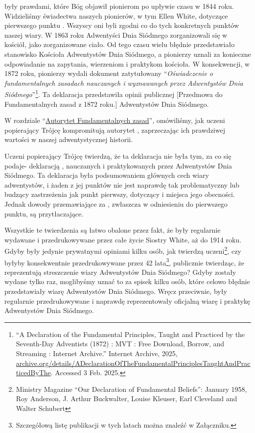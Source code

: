  były prawdami, które Bóg objawił pionierom po upływie czasu w 1844 roku. Widzieliśmy świadectwa naszych pionierów, w tym Ellen White, dotyczące pierwszego punktu . Wszyscy oni byli zgodni co do tych konkretnych punktów naszej wiary. W 1863 roku Adwentyści Dnia Siódmego zorganizowali się w kościół, jako zorganizowane ciało. Od tego czasu wielu błędnie przedstawiało stanowisko Kościoła Adwentystów Dnia Siódmego, a pionierzy uznali za konieczne odpowiadanie na zapytania,  wierzeniom i praktykom kościoła. W konsekwencji, w 1872 roku, pionierzy wydali dokument zatytułowany “\textit{Oświadczenie o fundamentalnych zasadach nauczanych i wyznawanych przez Adwentystów Dnia Siódmego}”\footnote{“A Declaration of the Fundamental Principles, Taught and Practiced by the Seventh-Day Adventists (1872) : MVT : Free Download, Borrow, and Streaming : Internet Archive.” Internet Archive, 2025, \href{https://archive.org/details/ADeclarationOfTheFundamentalPrinciplesTaughtAndPracticedByThe}{archive.org/details/ADeclarationOfTheFundamentalPrinciplesTaughtAndPracticedByThe}. Accessed 3 Feb. 2025.}. Ta deklaracja przedstawiła opinii publicznej [Przedmowa do Fundamentalnych zasad z 1872 roku.] Adwentystów Dnia Siódmego.

W rozdziale “\hyperref[chap:authority]{Autorytet Fundamentalnych zasad}”, omówiliśmy, jak uczeni popierający Trójcę kompromitują autorytet , zaprzeczając ich prawdziwej wartości w naszej adwentystycznej historii.

Uczeni popierający Trójcę twierdzą, że ta deklaracja nie była tym, za co się podaje- deklaracją , nauczanych i praktykowanych przez Adwentystów Dnia Siódmego. Ta deklaracja była podsumowaniem głównych cech wiary adwentystów, i żaden z jej punktów nie jest naprawdę tak problematyczny lub budzący zastrzeżenia jak  punkt pierwszy, dotyczący  i miejsca jego obecności. Jednak dowody przemawiające za  , zwłaszcza w odniesieniu do pierwszego punktu, są przytłaczające.

Wszystkie te twierdzenia są łatwo obalone przez fakt, że  były regularnie wydawane i przedrukowywane przez całe życie Siostry White, aż do 1914 roku. Gdyby były jedynie prywatnymi opiniami kilku osób, jak twierdzą uczeni\footnote{Ministry Magazine “Our Declaration of Fundamental Beliefs”: January 1958, Roy Anderson, J. Arthur Buckwalter, Louise Kleuser, Earl Cleveland and Walter Schubert}, czy byłyby konsekwentnie przedrukowywane przez 42 lata\footnote{Szczegółową listę publikacji w tych latach można znaleźć w Załączniku.}, publicznie twierdząc, że reprezentują streszczenie wiary Adwentystów Dnia Siódmego? Gdyby zostały wydane tylko raz, moglibyśmy uznać to za spisek kilku osób, które celowo błędnie przedstawiały wiarę Adwentystów Dnia Siódmego. Wręcz przeciwnie,  były regularnie przedrukowywane i naprawdę reprezentowały oficjalną wiarę i praktykę Adwentystów Dnia Siódmego.

